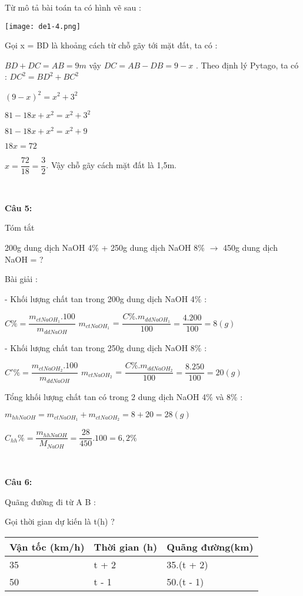 \documentclass[12pt]{article}
\begin{document}
{Từ mô tả bài toán ta có hình vẽ sau : \par
\texttt{[image: de1-4.png]} \par
Gọi x = BD là khoảng cách từ chỗ gãy tới mặt đất, ta có : \par
$BD + DC = AB = 9m $ vậy $ DC = AB - DB = 9 - x$   . Theo định lý Pytago, ta có : $DC^2 = BD^2 + BC^2$ \par
\Leftrightarrow $ (9 - x)^2 = x^2 + 3^2$ \par
\Leftrightarrow $ 81 - 18x + x^2 = x^2 + 3^2$ \par
\Leftrightarrow $ 81 - 18x + x^2 = x^2 + 9$ \par
\Leftrightarrow $ 18x = 72$ \par \Leftrightarrow $ x = \dfrac{72}{18} = \dfrac{3}{2}$. Vậy chỗ gãy cách mặt đất là 1,5m.

\    

\textbf{Câu 5:} \par
Tóm tắt \par
200g dung dịch NaOH 4\% + 250g dung dịch NaOH 8\% $\rightarrow$ 450g dung dịch NaOH = ? \par
Bài giải : \par
- Khối lượng chất tan trong 200g dung dịch NaOH 4\% : \par
$C\% = \dfrac{m_{ct NaOH_1} . 100}{m_{dd NaOH}}$ \Rightarrow $ m_{ct NaOH_1}$ = $ \dfrac{C\% . m_{dd NaOH_1}}{100} = \dfrac{4 . 200}{100} = 8 (g)$ \par
- Khối lượng chất tan trong 250g dung dịch NaOH 8\% : \par
$C'\% = \dfrac{m_{ct NaOH_2} . 100}{m_{dd NaOH}}$ \Rightarrow $ m_{ct NaOH_2}$ = $ \dfrac{C\% . m_{dd NaOH_2}}{100} = \dfrac{8 . 250}{100} = 20 (g)$ \par

Tổng khối lượng chất tan có trong 2 dung dịch NaOH 4\% và 8\% : \par

$m_{hh NaOH} =  m_{ct NaOH_1} + m_{ct NaOH_2} = 8 + 20 = 28(g)$

$C_{hh}\% = \dfrac{m_{hh NaOH}}{M_{NaOH}} = \dfrac{28}{450} . 100 = 6,2 \% $

\   

\textbf{Câu 6:} \par
Quãng đường đi từ A \rightarrow B : \par
Gọi thời gian dự kiến là t(h) ? \par

\begin{center}
\begin{tabular}{ | m{3cm} | m{3cm}| m{3cm} | } 
\hline
Vận tốc (km/h) & Thời gian (h) & Quãng đường(km) \\ 
\hline
35 & t + 2 &  35.(t + 2)\\ 
\hline
50 & t - 1 & 50.(t - 1) \\ 
\hline
\end{tabular}
\end{center}

}
\end{document}
